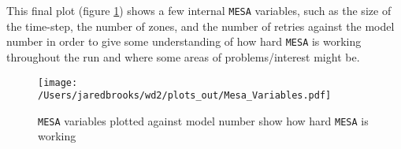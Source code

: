 \documentclass{article}
\begin{document}
        \pagebreak

        This final plot (figure \ref{fig:6}) shows a few internal \texttt{MESA} variables, such as the size of the time-step, the number of zones, and the number of retries against the model number in order to give some understanding of how hard \texttt{MESA} is working throughout the run and where some areas of problems/interest might be.

        \begin{figure}[H]
          \centering
          \texttt{[image: /Users/jaredbrooks/wd2/plots\_out/Mesa\_Variables.pdf]}
          \caption{\texttt{MESA} variables plotted against model number show how hard \texttt{MESA} is working}
          \label{fig:6}
        \end{figure}
\end{document}

